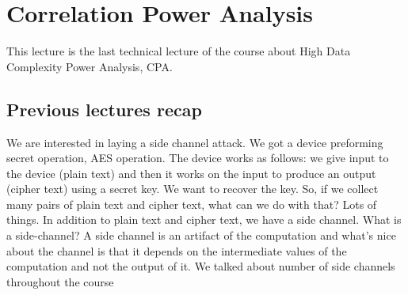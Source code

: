 \chapter{Correlation Power Analysis} \label{c8_fifthcapter}
This lecture is the last technical lecture of the course about High Data Complexity Power Analysis, CPA.
\section{Previous lectures recap}\label{c8_prev_lectures_recap:sec}
We are interested in laying a side channel attack. We got a device preforming secret operation, AES operation. The device works as follows: we give input to the device (plain text) and then it works on the input to produce an output (cipher text) using a secret key. We want to recover the key. So, if we collect many pairs of plain text and cipher text, what can we do with that? Lots of things. In addition to plain text and cipher text, we have a side channel. 
What is a side-channel? A side channel is an artifact of the computation and what’s nice about the channel is that it depends on the intermediate values of the computation and not the output of it. We talked about number of side channels throughout the course

